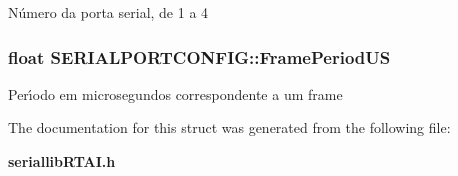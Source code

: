 N\'{u}mero da porta serial, de 1 a 4 
\subsubsection{\setlength{\rightskip}{0pt plus 5cm}float \bf{SERIALPORTCONFIG::Frame\-Period\-US}}\label{structSERIALPORTCONFIG_e5c4edc520a9a85a82daada36fb4ea40}


Per\'{\i}odo em microsegundos correspondente a um frame 

The documentation for this struct was generated from the following file:\begin{CompactItemize}
\item 
\bf{seriallib\-RTAI.h}\end{CompactItemize}
